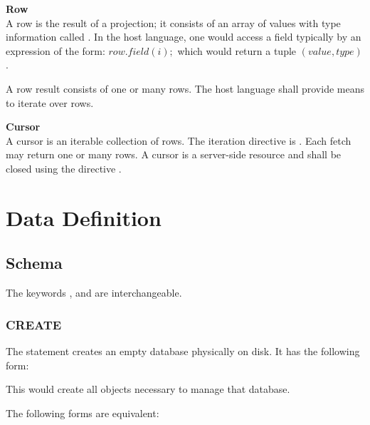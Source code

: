 \begin{minipage}{\textwidth}
\textbf{Row}\\
A row is the result of a projection;
it consists of an array of values
with type information called .
In the host language, one would access a field
typically by an expression of the form:
$row.field(i);$
which would return a tuple $(value,type)$.

A row result consists of one or many rows.
The host language shall provide means
to iterate over rows.
\end{minipage}

\begin{minipage}{\textwidth}
\textbf{Cursor}\\
A cursor is an iterable collection of rows.
The iteration directive is .
Each fetch may return one or many rows.
A cursor is a server-side resource
and shall be closed using the directive .
\end{minipage}

\section{Data Definition}


\subsection{Schema}
The keywords
,  and 
are interchangeable.

\subsubsection{CREATE}
The  statement
creates an empty database physically on disk.
It has the following form:

 

This would create all objects necessary
to manage that database.

The following forms are equivalent:

 \\
 

